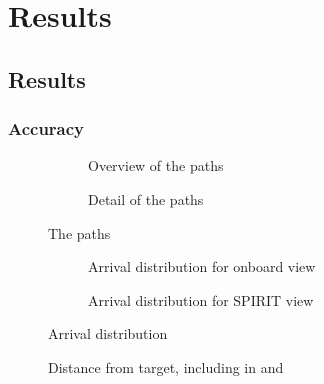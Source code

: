 \chapter{Results}
\label{ch:results}
\section{Results}
  \subsection{Accuracy}
  \begin{figure}[h]
    \centering
    \begin{subfigure}[b]{0.45\textwidth}
      \ifdraft{}{}
      \label{fig:paths_overview}
      \caption{Overview of the paths}
    \end{subfigure}
    \hfill
    \begin{subfigure}[b]{0.45\textwidth}
      \ifdraft{}{}
      \label{fig:paths_detailed}
      \caption{Detail of the paths}
    \end{subfigure}
    \label{fig:paths}
    \caption{The paths}
  \end{figure}

  \begin{figure}[h]
    \centering
    \begin{subfigure}[b]{0.45\textwidth}
      \ifdraft{}{}
      \label{fig:distribution_onboard}
      \caption{Arrival distribution for onboard view}
    \end{subfigure}
    \hfill
    \begin{subfigure}[b]{0.45\textwidth}
      \ifdraft{}{}
      \label{fig:distribution_spirit}
      \caption{Arrival distribution for SPIRIT view}
    \end{subfigure}
    \label{fig:distribution}
    \caption{Arrival distribution}
  \end{figure}

  \begin{figure}[h]
    \centering
    \ifdraft{}{}
    \label{fig:distance}
    \caption{Distance from target, including in  and }
  \end{figure}

